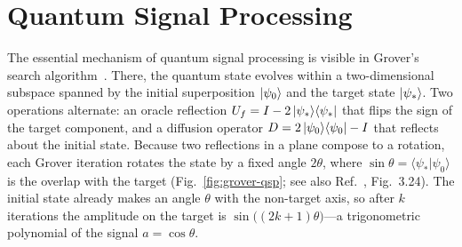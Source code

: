 \section{Quantum Signal Processing}
\label{sec:preliminaries}

The essential mechanism of quantum signal processing is
visible in Grover's search
algorithm~\cite{Grover1997}.  There, the quantum state
evolves within a two-dimensional subspace spanned by
the initial superposition $\ket{\psi_0}$ and the target
state $\ket{\psi_*}$.  Two operations alternate: an
oracle reflection
$U_f = I - 2\ket{\psi_*}\!\bra{\psi_*}$ that flips
the sign of the target component, and a diffusion
operator $D = 2\ket{\psi_0}\!\bra{\psi_0} - I$ that
reflects about the initial state.  Because two
reflections in a plane compose to a rotation, each
Grover iteration rotates the state by a fixed angle
$2\theta$, where
$\sin\theta = \langle\psi_*|\psi_0\rangle$ is the
overlap with the target
(Fig.~\ref{fig:grover-qsp};
see also Ref.~\cite{BenentiCasatiStrini2004}, Fig.~3.24).  The initial state
already makes an angle $\theta$ with the
non-target axis, so after $k$ iterations the amplitude
on the target is $\sin\!\big((2k{+}1)\theta\big)$---a
trigonometric polynomial of the signal
$a = \cos\theta$.

